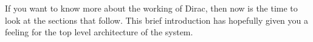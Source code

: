 If you want to know more about the working of Dirac, then now is the
time to look at the sections that follow. This brief introduction has
hopefully given you a feeling for the top level architecture of the
system.
